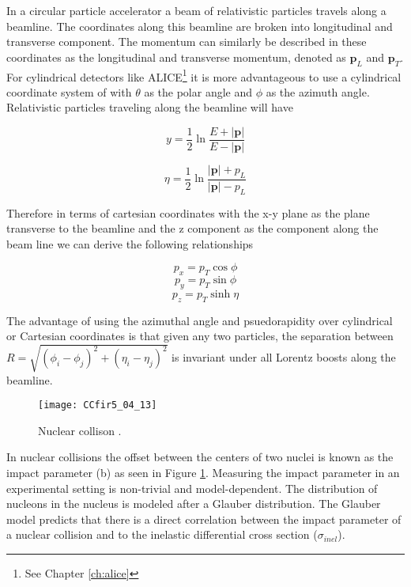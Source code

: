 In a circular particle accelerator a beam of relativistic particles travels along a beamline.  The coordinates along this beamline are broken into longitudinal and transverse component. The momentum can similarly be described in these coordinates as the longitudinal and transverse momentum, denoted as $\mathbf{p}_{L}$ and $\mathbf{p}_{T}$.  For cylindrical detectors like ALICE\footnote{See Chapter \ref{ch:alice}} it is more advantageous to use a cylindrical coordinate system of with $\theta$ as the polar angle and $\phi$ as the azimuth angle.  Relativistic particles traveling along the beamline will have 

\begin{equation}
\textit{y} = \frac{1}{2} \ln \frac{E + |\mathbf{p}|}{E - |\mathbf{p}|}
\label{eq:rapidity}
\end{equation}

\begin{equation}
\eta = \frac{1}{2} \ln \frac{|\mathbf{p}| + p_{L}}{|\mathbf{p}| - p_{L}}
\label{eq:psuedo}
\end{equation}

\noindent
Therefore in terms of cartesian coordinates with the x-y plane as the plane transverse to the beamline and the z component as the component along the beam line we can derive the following relationships

\begin{equation}
p_{x} = p_{T} \cos \phi
\label{eq:xcomp}
\end{equation}
\begin{equation}
p_{y} = p_{T} \sin \phi
\label{eq:ycomp}
\end{equation}
\begin{equation}
p_{z} = p_{T} \sinh \eta
\label{eq:zcomp}
\end{equation}

\noindent
The advantage of using the azimuthal angle and psuedorapidity over cylindrical or Cartesian coordinates is that given any two particles, the separation between $R = \sqrt{ (\phi_{i} - \phi_{j})^{2} + (\eta_{i} - \eta_{j})^{2}  } $ is invariant under all Lorentz boosts along the beamline.


\begin{figure}[h]
\texttt{[image: CCfir5\_04\_13]}
\centering
\caption{Nuclear collison  .}
\label{fig:centrality}
\end{figure}

\noindent
In nuclear collisions the offset between the centers of two nuclei is known as the impact parameter (b) as seen in Figure \ref{fig:centrality}.  Measuring the impact parameter in an experimental setting is non-trivial and model-dependent.  The distribution of nucleons in the nucleus is modeled after a Glauber distribution\cite{Loizides:2016djv}.  The Glauber model predicts that there is a direct correlation between the impact parameter of a nuclear collision and to the inelastic differential cross section ($\sigma_{inel}$)\cite{Miller:2007ri}.


